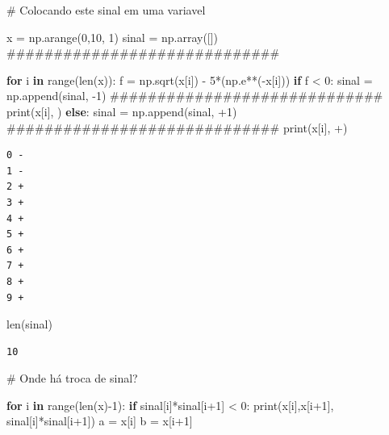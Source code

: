 \documentclass[
  letterpaper,
  DIV=11,
  numbers=noendperiod]{scrreprt}
\newenvironment{Shaded}{\begin{snugshade}}{\end{snugshade}}
\newcommand{\BuiltInTok}[1]{\textcolor[rgb]{0.00,0.23,0.31}{#1}}
\newcommand{\CommentTok}[1]{\textcolor[rgb]{0.37,0.37,0.37}{#1}}
\newcommand{\ControlFlowTok}[1]{\textcolor[rgb]{0.00,0.23,0.31}{\textbf{#1}}}
\newcommand{\DecValTok}[1]{\textcolor[rgb]{0.68,0.00,0.00}{#1}}
\newcommand{\KeywordTok}[1]{\textcolor[rgb]{0.00,0.23,0.31}{\textbf{#1}}}
\newcommand{\NormalTok}[1]{\textcolor[rgb]{0.00,0.23,0.31}{#1}}
\newcommand{\OperatorTok}[1]{\textcolor[rgb]{0.37,0.37,0.37}{#1}}
\newcommand{\StringTok}[1]{\textcolor[rgb]{0.13,0.47,0.30}{#1}}
\begin{document}
\begin{Shaded}
\begin{Highlighting}[]
\CommentTok{\# Colocando este sinal em uma variavel}

\NormalTok{x }\OperatorTok{=}\NormalTok{ np.arange(}\DecValTok{0}\NormalTok{,}\DecValTok{10}\NormalTok{, }\DecValTok{1}\NormalTok{)}
\NormalTok{sinal }\OperatorTok{=}\NormalTok{ np.array([]) }\CommentTok{\#\#\#\#\#\#\#\#\#\#\#\#\#\#\#\#\#\#\#\#\#\#\#\#\#\#\#\#\#}

\ControlFlowTok{for}\NormalTok{ i }\KeywordTok{in} \BuiltInTok{range}\NormalTok{(}\BuiltInTok{len}\NormalTok{(x)):}
\NormalTok{    f }\OperatorTok{=}\NormalTok{ np.sqrt(x[i]) }\OperatorTok{{-}} \DecValTok{5}\OperatorTok{*}\NormalTok{(np.e}\OperatorTok{**}\NormalTok{(}\OperatorTok{{-}}\NormalTok{x[i]))}
    \ControlFlowTok{if}\NormalTok{ f }\OperatorTok{\textless{}} \DecValTok{0}\NormalTok{:}
\NormalTok{        sinal }\OperatorTok{=}\NormalTok{ np.append(sinal, }\OperatorTok{{-}}\DecValTok{1}\NormalTok{) }\CommentTok{\#\#\#\#\#\#\#\#\#\#\#\#\#\#\#\#\#\#\#\#\#\#\#\#\#\#\#\#\#}
        \BuiltInTok{print}\NormalTok{(x[i], }\StringTok{\textquotesingle{}{-}\textquotesingle{}}\NormalTok{)}
    \ControlFlowTok{else}\NormalTok{:}
\NormalTok{        sinal }\OperatorTok{=}\NormalTok{ np.append(sinal, }\OperatorTok{+}\DecValTok{1}\NormalTok{) }\CommentTok{\#\#\#\#\#\#\#\#\#\#\#\#\#\#\#\#\#\#\#\#\#\#\#\#\#\#\#\#\#}
        \BuiltInTok{print}\NormalTok{(x[i], }\StringTok{\textquotesingle{}+\textquotesingle{}}\NormalTok{)}
\end{Highlighting}
\end{Shaded}

\begin{verbatim}
0 -
1 -
2 +
3 +
4 +
5 +
6 +
7 +
8 +
9 +
\end{verbatim}

\begin{Shaded}
\begin{Highlighting}[]
\BuiltInTok{len}\NormalTok{(sinal)}
\end{Highlighting}
\end{Shaded}

\begin{verbatim}
10
\end{verbatim}

\begin{Shaded}
\begin{Highlighting}[]
\CommentTok{\# Onde há troca de sinal?}

\ControlFlowTok{for}\NormalTok{ i }\KeywordTok{in} \BuiltInTok{range}\NormalTok{(}\BuiltInTok{len}\NormalTok{(x)}\OperatorTok{{-}}\DecValTok{1}\NormalTok{):}
    \ControlFlowTok{if}\NormalTok{ sinal[i]}\OperatorTok{*}\NormalTok{sinal[i}\OperatorTok{+}\DecValTok{1}\NormalTok{] }\OperatorTok{\textless{}} \DecValTok{0}\NormalTok{:}
        \BuiltInTok{print}\NormalTok{(x[i],x[i}\OperatorTok{+}\DecValTok{1}\NormalTok{], sinal[i]}\OperatorTok{*}\NormalTok{sinal[i}\OperatorTok{+}\DecValTok{1}\NormalTok{])}
\NormalTok{        a }\OperatorTok{=}\NormalTok{ x[i]}
\NormalTok{        b }\OperatorTok{=}\NormalTok{ x[i}\OperatorTok{+}\DecValTok{1}\NormalTok{]}
\end{Highlighting}
\end{Shaded}
\end{document}
